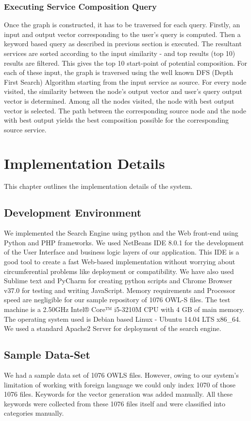 \documentclass[12pt, oneside]{book}
\begin{document}
\subsection{Executing Service Composition Query}
Once the graph is constructed, it has to be traversed for each query. Firstly, an input and output vector corresponding to the user's query is computed. Then a keyword based query as described in previous section is executed. The resultant services are sorted according to the input similarity - and top results (top 10) results are filtered. This gives the top 10 start-point of potential composition. For each of these input, the graph is traversed using the well known DFS (Depth First Search) Algorithm starting from the input service as source. For every node visited, the similarity between the node's output vector and user's query output vector is determined. Among all the nodes visited, the node with best output vector is selected. The path between the corresponding source node and the node with best output yields the best composition possible for the corresponding source service.

\chapter{Implementation Details}
This chapter outlines the implementation details of the system.
\section{Development Environment}
We implemented the Search Engine using python and the Web front-end using Python and PHP frameworks. We used  NetBeans IDE 8.0.1 for the development of the User Interface and business logic layers of our  application. This IDE is a good tool to create a fast Web-based implementation without worrying about circumferential problems like deployment or compatibility. We have also used Sublime text and PyCharm for creating python scripts and Chrome Browser v37.0 for testing and writing JavaScript. Memory requirements and Processor speed are negligible for our sample repository of 1076 OWL-S files. The test machine is a 2.50GHz Intel® Core™ i5-3210M CPU with 4 GB of main memory. The operating system used is Debian based Linux - Ubuntu 14.04 LTS x86\_64. We used a standard Apache2 Server for deployment of the search engine.
\section{Sample Data-Set}
We had a sample data set of 1076 OWLS files. However, owing to our system's limitation of working with foreign language we could only index 1070 of those 1076 files. Keywords for the vector generation was added manually. All these keywords were collected from these 1076 files itself and were classified into categories manually.
\end{document}
